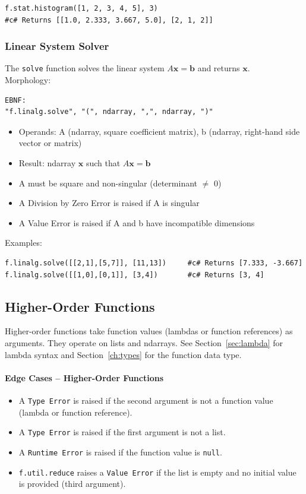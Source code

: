 \begin{verbatim}
f.stat.histogram([1, 2, 3, 4, 5], 3)
#c# Returns [[1.0, 2.333, 3.667, 5.0], [2, 1, 2]]
\end{verbatim}

\subsubsection{Linear System Solver}
The \texttt{solve} function solves the linear system $A\mathbf{x} = \mathbf{b}$ and returns $\mathbf{x}$.\\
Morphology:
\begin{verbatim}
EBNF:
"f.linalg.solve", "(", ndarray, ",", ndarray, ")"
\end{verbatim}
\begin{itemize}
\item Operands: A (ndarray, square coefficient matrix), b (ndarray, right-hand side vector or matrix)
\item Result: ndarray $\mathbf{x}$ such that $A\mathbf{x} = \mathbf{b}$
\item A must be square and non-singular (determinant $\neq$ 0)
\item A Division by Zero Error is raised if A is singular
\item A Value Error is raised if A and b have incompatible dimensions
\end{itemize}
Examples:
\begin{verbatim}
f.linalg.solve([[2,1],[5,7]], [11,13])     #c# Returns [7.333, -3.667]
f.linalg.solve([[1,0],[0,1]], [3,4])       #c# Returns [3, 4]
\end{verbatim}


\subsection{Higher-Order Functions}
Higher-order functions take function values (lambdas or function references) as arguments. They operate on lists and ndarrays. See Section~\ref{sec:lambda} for lambda syntax and Section~\ref{ch:types} for the function data type.

\paragraph{Edge Cases -- Higher-Order Functions}
\begin{itemize}
\item A \texttt{Type Error} is raised if the second argument is not a function value (lambda or function reference).
\item A \texttt{Type Error} is raised if the first argument is not a list.
\item A \texttt{Runtime Error} is raised if the function value is \texttt{null}.
\item \texttt{f.util.reduce} raises a \texttt{Value Error} if the list is empty and no initial value is provided (third argument).
\end{itemize}

